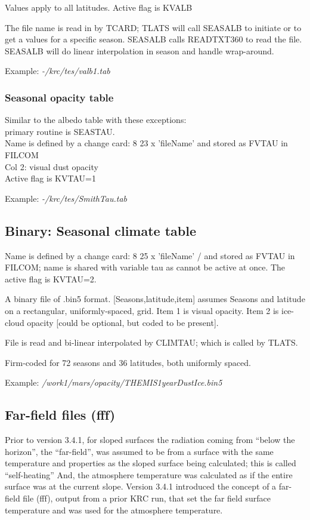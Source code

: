 \documentclass{article}
\newcommand{\qi}{\\ \hspace*{2.em}}      %
\newcommand{\nf}{\textit}  %
\begin{document}
Values apply to all latitudes. Active flag is KVALB

The file name is read in by TCARD; TLATS will call SEASALB to initiate or to get
a values for a specific season. SEASALB calls READTXT360 to read the
file. SEASALB will do linear interpolation in season and handle wrap-around.

Example: \nf{-/krc/tes/valb1.tab}

\subsubsection{Seasonal opacity table}
Similar to the albedo table with these exceptions:
\qi primary routine is SEASTAU.
\qi Name is defined by a change card:  8 23 x 'fileName' and stored as FVTAU in FILCOM
\qi Col 2: visual dust opacity
\qi Active flag is KVTAU=1

Example: \nf{-/krc/tes/SmithTau.tab} 

\subsection{Binary: Seasonal climate table}
Name is defined by a change card: 8 25 x 'fileName' / and stored as FVTAU in
FILCOM; name is shared with variable tau as cannot be active at once. The active
flag is KVTAU=2.

A binary file of .bin5 format. [Seasons,latitude,item] assumes Seasons and
latitude on a rectangular, uniformly-spaced, grid. Item 1 is visual opacity.
Item 2 is ice-cloud opacity [could be optional, but coded to be present].

File is read and bi-linear interpolated by CLIMTAU; which is called by TLATS. 
  
Firm-coded for 72 seasons and 36 latitudes, both uniformly spaced. 

Example: \nf{/work1/mars/opacity/THEMIS1yearDustIce.bin5}

\subsection{Far-field files (fff) \label{fff} }
Prior to version 3.4.1, for sloped surfaces the radiation coming from ``below
the horizon'', the ``far-field'', was assumed to be from a surface with the same
temperature and properties as the sloped surface being calculated; this is
called ``self-heating'' And, the atmosphere temperature was calculated as if the
entire surface was at the current slope. Version 3.4.1 introduced the concept of
a far-field file (fff), output from a prior KRC run, that set the far field
surface temperature and was used for the atmosphere temperature.
\end{document}
